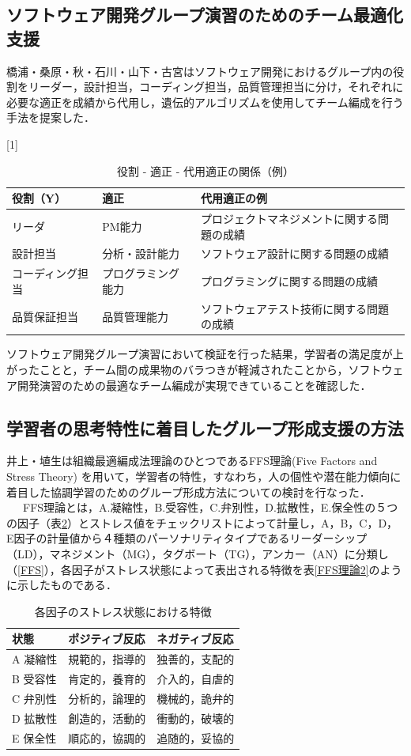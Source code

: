 \documentclass{funthesis}
\begin{document}
\subsection{ソフトウェア開発グループ演習のためのチーム最適化支援}
橋浦・桑原・秋・石川・山下・古宮\cite{A6}はソフトウェア開発におけるグループ内の役割をリーダー，設計担当，コーディング担当，品質管理担当に分け，それぞれに必要な適正を成績から代用し，遺伝的アルゴリズムを使用してチーム編成を行う手法を提案した．
\begin{table}[H]
\begin{center}
  \caption{役割 - 適正 - 代用適正の関係（例）}
  \scalebox{0.9}[1]{
  \begin{tabular}{lll} \hline
    役割（Y） & 適正 & 代用適正の例\tabularnewline \hline
    リーダ & PM能力 & プロジェクトマネジメントに関する問題の成績\tabularnewline
    設計担当 &分析・設計能力 & 
    ソフトウェア設計に関する問題の成績\tabularnewline
    コーディング担当&プログラミング能力 &
    プログラミングに関する問題の成績\tabularnewline
    品質保証担当&品質管理能力 &
    ソフトウェアテスト技術に関する問題の成績\tabularnewline
    \hline
  \end{tabular}
}
  \label{適正}
  \end{center}
\end{table}
ソフトウェア開発グループ演習において検証を行った結果，学習者の満足度が上がったことと，チーム間の成果物のバラつきが軽減されたことから，ソフトウェア開発演習のための最適なチーム編成が実現できていることを確認した．


\subsection{学習者の思考特性に着目したグループ形成支援の方法}
井上・埴生は\cite{A7}組織最適編成法理論のひとつであるFFS理論(Five Factors and Stress Theory)
\cite{A8}を用いて，学習者の特性，すなわち，人の個性や潜在能力傾向に着目した協調学習のためのグループ形成方法についての検討を行なった．\\
\ \ \ FFS理論とは，A.凝縮性，B.受容性，C.弁別性，D.拡散性，E.保全性の５つの因子（表\ref{FFS理論}）とストレス値をチェックリストによって計量し，A，B，C，D，E因子の計量値から４種類のパーソナリティタイプであるリーダーシップ（LD），マネジメント（MG），タグボート（TG），アンカー（AN）に分類し（\ref{FFS}），各因子がストレス状態によって表出される特徴を表\ref{FFS理論2}のように示したものである\cite{A9}．

\begin{table}[H]
\begin{center}
  \caption{各因子のストレス状態における特徴}
  
  \begin{tabular}{lll} \hline
    状態 & ポジティブ反応 & ネガティブ反応\tabularnewline \hline
    A 凝縮性& 規範的，指導的 & 
    独善的，支配的\tabularnewline
    B 受容性 &肯定的，養育的 & 
    介入的，自虐的\tabularnewline
    C 弁別性&分析的，論理的 &
    機械的，詭弁的\tabularnewline
    D 拡散性&創造的，活動的 &
    衝動的，破壊的\tabularnewline
    E 保全性&順応的，協調的 &
    追随的，妥協的\tabularnewline
    \hline
  \end{tabular}
  \label{FFS理論}
  \end{center}
\end{table}
\end{document}
